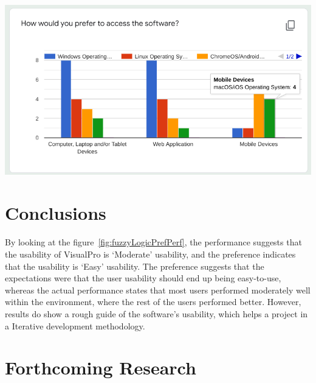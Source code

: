 \documentclass[a0,portrait]{a0poster}
\begin{document}
\begin{multicols}{2}
\begin{center}\vspace{1cm}
\includegraphics[width=0.55\linewidth]{../../Showcase-Work_Completed/Surveying/q12.png}
\label{fig:q-12}
\end{center}\vspace{1cm}


\color{DarkRed} %

\section*{Conclusions}
By looking at the figure~\ref{fig:fuzzyLogicPrefPerf}, the performance suggests that the usability of VisualPro is `Moderate' usability, and the preference indicates that the usability is `Easy' usability. The preference suggests that the expectations were that the user usability should end up being easy-to-use, whereas the actual performance states that most users performed moderately well within the environment, where the rest of the users performed better. However, results do show a rough guide of the software's usability, which helps a project in a Iterative development methodology.

\color{DarkSlateGray} %


\section*{Forthcoming Research}


\end{multicols}
\end{document}
